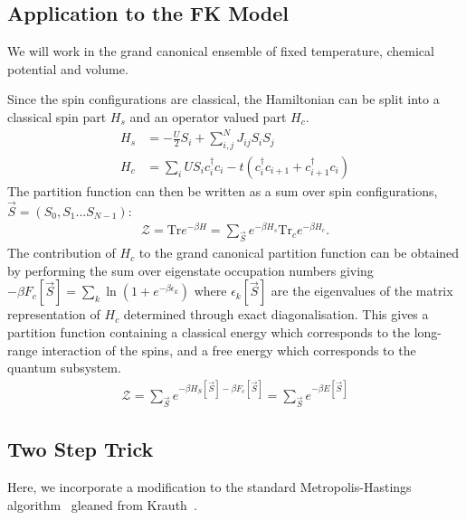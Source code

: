 \hypertarget{application-to-the-fk-model}{%
\subsection{Application to the FK Model}\label{application-to-the-fk-model}}

We will work in the grand canonical ensemble of fixed temperature, chemical potential and volume.

Since the spin configurations are classical, the Hamiltonian can be split into a classical spin part \(H_s\) and an operator valued part \(H_c\). \[\begin{aligned}
H_s& = - \frac{U}{2}S_i + \sum_{i, j}^{N} J_{ij} S_i S_j \\
H_c& = \sum_i U S_i c^\dagger_{i}c_{i} -t(c^\dagger_{i}c_{i+1} + c^\dagger_{i+1}c_{i}) 
\end{aligned}\] The partition function can then be written as a sum over spin configurations, \(\vec{S} = (S_0, S_1...S_{N-1})\): \[\begin{aligned}
\mathcal{Z} = \mathrm{Tr} e^{-\beta H}= \sum_{\vec{S}} e^{-\beta H_s} \mathrm{Tr}_c e^{-\beta H_c} .
\end{aligned}
\] The contribution of \(H_c\) to the grand canonical partition function can be obtained by performing the sum over eigenstate occupation numbers giving \(-\beta F_c[\vec{S}] = \sum_k \ln{(1 + e^{- \beta \epsilon_k})}\) where \({\epsilon_k[\vec{S}]}\) are the eigenvalues of the matrix representation of \(H_c\) determined through exact diagonalisation. This gives a partition function containing a classical energy which corresponds to the long-range interaction of the spins, and a free energy which corresponds to the quantum subsystem. \[\begin{aligned}
\mathcal{Z} = \sum_{\vec{S}} e^{-\beta H_S[\vec{S}] - \beta F_c[\vec{S}]} = \sum_{\vec{S}} e^{-\beta E[\vec{S}]}
\end{aligned}\]

\hypertarget{two-step-trick}{%
\subsection{Two Step Trick}\label{two-step-trick}}

Here, we incorporate a modification to the standard Metropolis-Hastings algorithm~\autocite{hastingsMonteCarloSampling1970} gleaned from Krauth~\autocite{krauthIntroductionMonteCarlo1998}.

